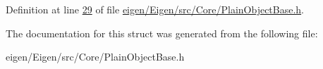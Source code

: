 Definition at line \hyperlink{eigen_2_eigen_2src_2_core_2_plain_object_base_8h_source_l00029}{29} of file \hyperlink{eigen_2_eigen_2src_2_core_2_plain_object_base_8h_source}{eigen/\+Eigen/src/\+Core/\+Plain\+Object\+Base.\+h}.



The documentation for this struct was generated from the following file\+:\begin{DoxyCompactItemize}
\item 
eigen/\+Eigen/src/\+Core/\+Plain\+Object\+Base.\+h\end{DoxyCompactItemize}
